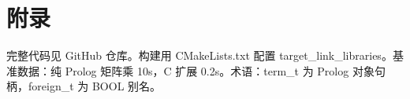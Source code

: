 \chapter{附录}
完整代码见 GitHub 仓库。构建用 CMakeLists.txt 配置 target\_{}link\_{}libraries。基准数据：纯 Prolog 矩阵乘 10s，C 扩展 0.2s。术语：term\_{}t 为 Prolog 对象句柄，foreign\_{}t 为 BOOL 别名。\par
